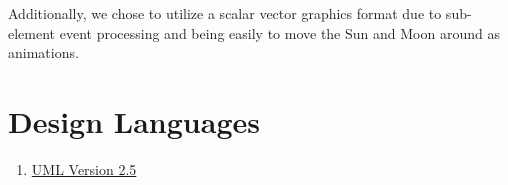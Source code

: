\documentclass[10pt, onecolumn, draftclsnofoot, letterpaper, compsoc]{IEEEtran}
\begin{document}
Additionally, we chose to utilize a scalar vector graphics
format due to sub-element event processing and being easily
to move the Sun and Moon around as animations. \\

\section{Design Languages}

\begin{enumerate}
    \item \href{http://www.omg.org/spec/UML/2.5}{UML Version 2.5}
\end{enumerate}



\end{document}
